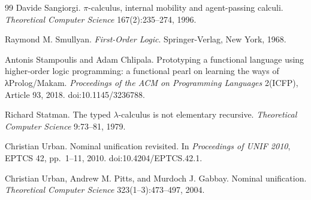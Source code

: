 \begin{thebibliography}{99}
Davide Sangiorgi.
\newblock $\pi$-calculus, internal mobility and agent-passing calculi.
\newblock \emph{Theoretical Computer Science} 167(2):235--274, 1996.

Raymond M. Smullyan.
\newblock \emph{First-Order Logic}.
\newblock Springer-Verlag, New York, 1968.

Antonis Stampoulis and Adam Chlipala.
\newblock Prototyping a functional language using higher-order logic programming: a functional pearl on
  learning the ways of λProlog/Makam.
\newblock \emph{Proceedings of the ACM on Programming Languages} 2(ICFP), Article 93, 2018.
  doi:10.1145/3236788.

Richard Statman.
\newblock The typed $\lambda$-calculus is not elementary recursive.
\newblock \emph{Theoretical Computer Science} 9:73--81, 1979.

Christian Urban.
\newblock Nominal unification revisited.
\newblock In \emph{Proceedings of UNIF 2010}, EPTCS 42, pp.~1--11, 2010. doi:10.4204/EPTCS.42.1.

Christian Urban, Andrew M. Pitts, and Murdoch J. Gabbay.
\newblock Nominal unification.
\newblock \emph{Theoretical Computer Science} 323(1--3):473--497, 2004.

\end{thebibliography}
